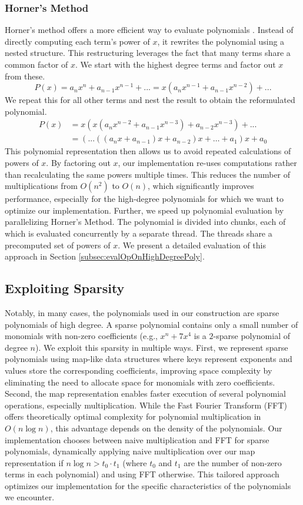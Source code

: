 \subsubsection{Horner's Method}
\label{subsec:horner}
Horner's method offers a more efficient way to evaluate polynomials \cite{horner1819xxi}. Instead of directly computing each term's power of $x$, it rewrites the polynomial using a nested structure. This restructuring leverages the fact that many terms share a common factor of $x$. We start with the highest degree terms and factor out $x$ from these.
$$
P(x) = a_n x^n + a_{n-1} x^{n-1} + ... = x(a_n x^{n-1} + a_{n-1} x^{n-2}) + ...
$$
We repeat this for all other terms and nest the result to obtain the reformulated polynomial.
$$
\begin{aligned}
P(x) &= x(x(a_n x^{n-2} + a_{n-1} x^{n-3}) + a_{n-2}x^{n-3}) + ... \\
& = (...((a_nx + a_{n-1})x + a_{n-2})x + \ldots + a_1)x + a_0
\end{aligned}
$$
This polynomial representation then allows us to avoid repeated calculations of powers of $x$. By factoring out $x$, our implementation re-uses computations rather than recalculating the same powers multiple times. This reduces the number of multiplications from $O(n^2)$ to $O(n)$, which significantly improves performance, especially for the high-degree polynomials for which we want to optimize our implementation. Further, we speed up polynomial evaluation by parallelizing Horner's Method. The polynomial is divided into chunks, each of which is evaluated concurrently by a separate thread. The threads share a precomputed set of powers of $x$. We present a detailed evaluation of this approach in Section \ref{subsec:evalOpOnHighDegreePoly}.

\subsection{Exploiting Sparsity}
\label{subesec:exploitingSparsity}
Notably, in many cases, the polynomials used in our construction are sparse polynomials of high degree. A sparse polynomial contains only a small number of monomials with non-zero coefficients (e.g., $x^n + 7x^4$ is a $2$-sparse polynomial of degree $n$). We exploit this sparsity in multiple ways. First, we represent sparse polynomials using map-like data structures where keys represent exponents and values store the corresponding coefficients, improving space complexity by eliminating the need to allocate space for monomials with zero coefficients. Second, the map representation enables faster execution of several polynomial operations, especially multiplication. While the Fast Fourier Transform (FFT) offers theoretically optimal complexity for polynomial multiplication in $O(n \log n)$, this advantage depends on the density of the polynomials. Our implementation chooses between naive multiplication and FFT for sparse polynomials, dynamically applying naive multiplication over our map representation if $n\log n > t_0 \cdot t_1$ (where $t_0$ and $t_1$ are the number of non-zero terms in each polynomial) and using FFT otherwise. This tailored approach optimizes our implementation for the specific characteristics of the polynomials we encounter. 

